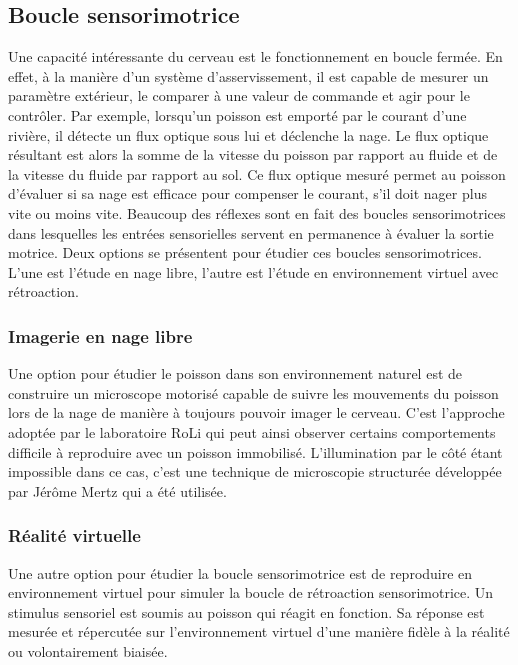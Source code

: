 \subsection{Boucle sensorimotrice}

Une capacité intéressante du cerveau est le fonctionnement en boucle fermée. En effet, à la manière d'un système d'asservissement, il est capable de mesurer un paramètre extérieur, le comparer à une valeur de commande et agir pour le contrôler. Par exemple, lorsqu'un poisson est emporté par le courant d'une rivière, il détecte un flux optique sous lui et déclenche la nage. Le flux optique résultant est alors la somme de la vitesse du poisson par rapport au fluide et de la vitesse du fluide par rapport au sol. Ce flux optique mesuré permet au poisson d'évaluer si sa nage est efficace pour compenser le courant, s'il doit nager plus vite ou moins vite. Beaucoup des réflexes sont en fait des boucles sensorimotrices dans lesquelles les entrées sensorielles servent en permanence à évaluer la sortie motrice. Deux options se présentent pour étudier ces boucles sensorimotrices. L'une est l'étude en nage libre, l'autre est l'étude en environnement virtuel avec rétroaction.

\subsubsection{Imagerie en nage libre}

Une option pour étudier le poisson dans son environnement naturel est de construire un microscope motorisé capable de suivre les mouvements du poisson lors de la nage de manière à toujours pouvoir imager le cerveau. C'est l'approche adoptée par le laboratoire RoLi \cite{kim_pan-neuronal_2017} qui peut ainsi observer certains comportements difficile à reproduire avec un poisson immobilisé. L'illumination par le côté étant impossible dans ce cas, c'est une technique de microscopie structurée développée par Jérôme Mertz \cite{mertz_optical_2011} qui a été utilisée.

\subsubsection{Réalité virtuelle}

Une autre option pour étudier la boucle sensorimotrice est de reproduire en environnement virtuel pour simuler la boucle de rétroaction sensorimotrice. Un stimulus sensoriel est soumis au poisson qui réagit en fonction. Sa réponse est mesurée et répercutée sur l'environnement virtuel d'une manière fidèle à la réalité ou volontairement biaisée.

